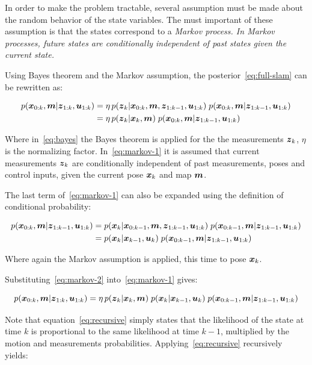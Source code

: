 In order to make the problem tractable, several assumption must be made about the random behavior of the state variables. The must important of these assumption is that the states correspond to a \it{Markov process}. In Markov processes, future states are conditionally independent of past states given the current state.

Using Bayes theorem and the Markov assumption, the posterior~\eqref{eq:full-slam} can be rewritten as:

\begin{align}
p(\boldsymbol{x}_{0:k},\boldsymbol{m}|\boldsymbol{z}_{1:k},\boldsymbol{u}_{1:k}) &= 
\eta\,p(\boldsymbol{z}_{k}|\boldsymbol{x}_{0:k},\boldsymbol{m},\boldsymbol{z}_{1:k-1},\boldsymbol{u}_{1:k})\; p(\boldsymbol{x}_{0:k},\boldsymbol{m}|\boldsymbol{z}_{1:k-1},\boldsymbol{u}_{1:k})
\label{eq:bayes}\\
&= \eta\,p(\boldsymbol{z}_{k}|\boldsymbol{x}_{k},\boldsymbol{m})\; p(\boldsymbol{x}_{0:k},\boldsymbol{m}|\boldsymbol{z}_{1:k-1},\boldsymbol{u}_{1:k})\label{eq:markov-1}
\end{align}

Where in~\eqref{eq:bayes} the Bayes theorem is applied for the the measurements $\boldsymbol{z}_k$, $\eta$ is the normalizing factor. In~\eqref{eq:markov-1} it is assumed that current measurements $\boldsymbol{z}_k$ are conditionally independent of past measurements, poses and control inputs, given the current pose $\boldsymbol{x}_k$ and map $\boldsymbol{m}$.

The last term of~\eqref{eq:markov-1} can also be expanded using the definition of conditional probability:

\begin{align}
p(\boldsymbol{x}_{0:k},\boldsymbol{m}|\boldsymbol{z}_{1:k-1},\boldsymbol{u}_{1:k}) &=
p(\boldsymbol{x}_{k}|\boldsymbol{x}_{0:k-1},\boldsymbol{m},\boldsymbol{z}_{1:k-1},\boldsymbol{u}_{1:k})\; p(\boldsymbol{x}_{0:k-1},\boldsymbol{m}|\boldsymbol{z}_{1:k-1},\boldsymbol{u}_{1:k})\\
&= p(\boldsymbol{x}_{k}|\boldsymbol{x}_{k-1},\boldsymbol{u}_{k})\; p(\boldsymbol{x}_{0:k-1},\boldsymbol{m}|\boldsymbol{z}_{1:k-1},\boldsymbol{u}_{1:k}) \label{eq:markov-2}
\end{align}

Where again the Markov assumption is applied, this time to pose $\boldsymbol{x}_k$. 

Substituting~\eqref{eq:markov-2} into~\eqref{eq:markov-1} gives:

\begin{equation}
p(\boldsymbol{x}_{0:k},\boldsymbol{m}|\boldsymbol{z}_{1:k},\boldsymbol{u}_{1:k}) = 
\eta\,p(\boldsymbol{z}_{k}|\boldsymbol{x}_{k},\boldsymbol{m})\;
p(\boldsymbol{x}_{k}|\boldsymbol{x}_{k-1},\boldsymbol{u}_{k})\; p(\boldsymbol{x}_{0:k-1},\boldsymbol{m}|\boldsymbol{z}_{1:k-1},\boldsymbol{u}_{1:k})
\label{eq:recursive}
\end{equation}

Note that equation~\eqref{eq:recursive} simply states that the likelihood of the state at time $k$ is proportional to the same likelihood at time $k-1$, multiplied by the motion and measurements probabilities. Applying~\eqref{eq:recursive} recursively yields:
  
